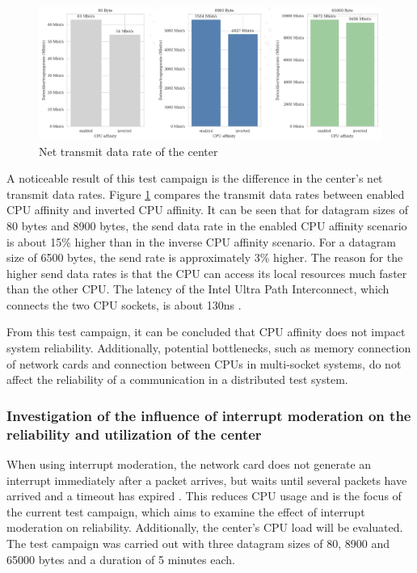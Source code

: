 \documentclass[	a4paper,
				11pt,
				DIV=11,
				bigheadings,
				idxtotoc,
				listof=totoc,	
				bibtotoc,		
				halfparskip,
				cleardoubleempty,
				oneside,
				openright]{scrartcl}
\begin{document}
\begin{figure}[h]
	\includegraphics[width=\textwidth]{fig9.png}
	\centering
	\caption{Net transmit data rate of the center}
    \label{fig:fig9}
\end{figure}

A noticeable result of this test campaign is the difference in the center's net transmit data rates. Figure \ref{fig:fig9} compares the transmit data rates between enabled CPU affinity and inverted CPU affinity. It can be seen that for datagram sizes of 80 bytes and 8900 bytes, the send data rate in the enabled CPU affinity scenario is about 15\% higher than in the inverse CPU affinity scenario. For a datagram size of 6500 bytes, the send rate is approximately 3\% higher. The reason for the higher send data rates is that the CPU can access its local resources much faster than the other CPU. The latency of the Intel Ultra Path Interconnect, which connects the two CPU sockets, is about 130ns \cite{tbd}.

From this test campaign, it can be concluded that CPU affinity does not impact system reliability. Additionally, potential bottlenecks, such as memory connection of network cards and connection between CPUs in multi-socket systems, do not affect the reliability of a communication in a distributed test system.


\subsubsection{Investigation of the influence of interrupt moderation on the reliability and utilization of the center}

When using interrupt moderation, the network card does not generate an interrupt immediately after a packet arrives, but waits until several packets have arrived and a timeout has expired \cite{tbd}. This reduces CPU usage and is the focus of the current test campaign, which aims to examine the effect of interrupt moderation on reliability. Additionally, the center's CPU load will be evaluated. The test campaign was carried out with three datagram sizes of 80, 8900 and 65000 bytes and a duration of 5 minutes each.
\end{document}
